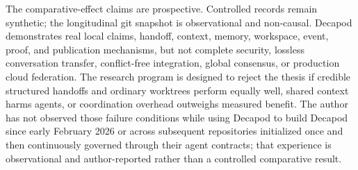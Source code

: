 The comparative-effect claims are prospective. Controlled records remain synthetic; the longitudinal git snapshot is observational and non-causal. Decapod demonstrates real local claims, handoff, context, memory, workspace, event, proof, and publication mechanisms, but not complete security, lossless conversation transfer, conflict-free integration, global consensus, or production cloud federation. The research program is designed to reject the thesis if credible structured handoffs and ordinary worktrees perform equally well, shared context harms agents, or coordination overhead outweighs measured benefit. The author has not observed those failure conditions while using Decapod to build Decapod since early February 2026 or across subsequent repositories initialized once and then continuously governed through their agent contracts; that experience is observational and author-reported rather than a controlled comparative result.
